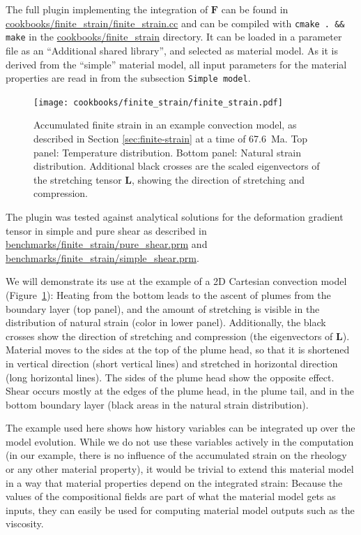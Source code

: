 \documentclass{article}
\begin{document}
The full plugin implementing the integration of $\mathbf F$ can be found in \url{cookbooks/finite_strain/finite_strain.cc} and can be compiled 
with \texttt{cmake . \&\& make} in the \url{cookbooks/finite_strain} directory. 
It can be loaded in a parameter file as an ``Additional shared library'', and selected as material
model. As it is derived from the ``simple'' material model, all input parameters for the material
properties are read in from the subsection \texttt{Simple model}. 


\begin{figure}
    \centering
    \texttt{[image: cookbooks/finite\_strain/finite\_strain.pdf]}
    \caption{Accumulated finite strain in an example convection model, as described in Section 
             \ref{sec:finite-strain} at a time of 67.6~Ma. Top panel: Temperature distribution. Bottom panel:
             Natural strain distribution. Additional black crosses are the scaled eigenvectors of the
             stretching tensor $\mathbf L$, showing the direction of stretching and compression.}
    \label{fig:finite_strain}
\end{figure}

The plugin was tested against analytical solutions for the deformation gradient tensor in simple and pure shear as described in \url{benchmarks/finite_strain/pure_shear.prm} and \url{benchmarks/finite_strain/simple_shear.prm}.

We will demonstrate its use at the example of a 2D Cartesian convection model (Figure~\ref{fig:finite_strain}):
Heating from the bottom leads to the ascent of plumes from the boundary layer (top panel), and the
amount of stretching is visible in the distribution of natural strain (color in lower panel).
Additionally, the black crosses show the direction of stretching and compression (the eigenvectors of $\mathbf L$). 
Material moves to the sides at the top of the plume head, so that it is shortened in vertical 
direction (short vertical lines) and stretched in horizontal direction (long horizontal lines). 
The sides of the plume head show the opposite effect. Shear occurs mostly at the 
edges of the plume head, in the plume tail, and in the bottom boundary layer 
(black areas in the natural strain distribution). 

The example used here shows how history variables can be integrated up over the model evolution. 
While we do not use these variables actively in the computation (in our example, there is no 
influence of the accumulated strain on the rheology or any other material property), it would be trivial 
to extend this material model in a way that material properties depend on the integrated strain: 
Because the values of the compositional fields are part of what the material model gets as inputs, 
they can easily be used for computing material model outputs such as the viscosity.  
\end{document}
